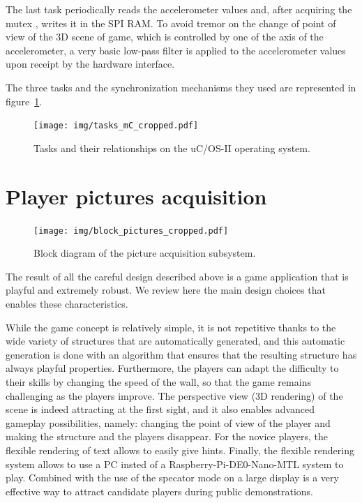 \documentclass[english, DIV=13]{scrreprt}
\begin{document}
The last task periodically reads the accelerometer values and, after acquiring
the mutex , writes it in the SPI RAM. To avoid tremor on the change of point of
view of the 3D scene of game, which is controlled by one of the axis of the
accelerometer, a very basic low-pass filter is applied to the accelerometer
values upon receipt by the hardware interface.

The three tasks and the synchronization mechanisms they used are represented in
figure~\ref{fig:tasks-mc}.

\begin{figure}[bth]
    \centering
    \texttt{[image: img/tasks\_mC\_cropped.pdf]}
    \caption{Tasks and their relationships on the uC/OS-II operating system.}
    \label{fig:tasks-mc}
\end{figure}


\chapter{Player pictures acquisition}
\label{chap:pic-acq}

\begin{figure}[bth]
    \centering
    \texttt{[image: img/block\_pictures\_cropped.pdf]}
    \caption{Block diagram of the picture acquisition subsystem.}
\end{figure}


The result of all the careful design described above is a game application that
is playful and extremely robust. We review here the main design choices that
enables these characteristics.

While the game concept is relatively simple, it is not repetitive thanks to the
wide variety of structures that are automatically generated, and this automatic
generation is done with an algorithm that ensures that the resulting structure
has always playful properties.  Furthermore, the players can adapt the
difficulty to their skills by changing the speed of the wall, so that the game
remains challenging as the players improve.  The perspective view (3D rendering)
of the scene is indeed attracting at the first sight, and it also enables
advanced gameplay possibilities, namely: changing the point of view of the
player and making the structure and the players disappear.  For the novice
players, the flexible rendering of text allows to easily give hints.  Finally,
the flexible rendering system allows to use a PC insted of a
Raspberry-Pi-DE0-Nano-MTL system to play.  Combined with the use of the specator
mode on a large display is a very effective way to attract candidate players
during public demonstrations.
\end{document}
